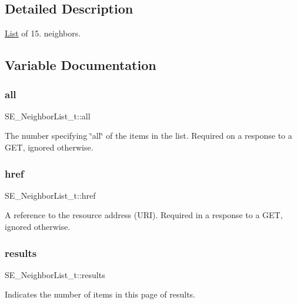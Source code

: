 \subsection{Detailed Description}
\hyperlink{structList}{List} of 15. neighbors. 

\subsection{Variable Documentation}
\mbox{\label{group__NeighborList_ga61ce4f83d73b20a324e57193fea5530a}} 
\subsubsection{\texorpdfstring{all}{all}}
{\footnotesize\ttfamily S\+E\+\_\+\+Neighbor\+List\+\_\+t\+::all}

The number specifying \char`\"{}all\char`\"{} of the items in the list. Required on a response to a G\+ET, ignored otherwise. \mbox{\label{group__NeighborList_ga971ff14701d973d68a904f70532feb2f}} 
\subsubsection{\texorpdfstring{href}{href}}
{\footnotesize\ttfamily S\+E\+\_\+\+Neighbor\+List\+\_\+t\+::href}

A reference to the resource address (U\+RI). Required in a response to a G\+ET, ignored otherwise. \mbox{\label{group__NeighborList_gab0040d876fb53305578656365b0cf0bd}} 
\subsubsection{\texorpdfstring{results}{results}}
{\footnotesize\ttfamily S\+E\+\_\+\+Neighbor\+List\+\_\+t\+::results}

Indicates the number of items in this page of results. 